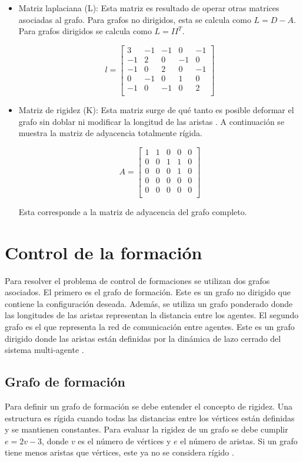 \begin{itemize}
	\item Matriz laplaciana (L): Esta matriz es resultado de operar otras matrices asociadas al grafo. Para grafos no dirigidos, esta se calcula como $L = D - A$. Para grafos dirigidos se calcula como $L = I I^T$.
	
	\[
	l = 
	\left[\begin{array}{ccccc}
		3 & -1 & -1 & 0 & -1 \\
		-1 & 2 & 0 & -1 & 0 \\
		-1 & 0 & 2 & 0 & -1 \\
		0 & -1 & 0 & 1 & 0 \\
		-1 & 0 & -1 & 0 & 2 \\
	\end{array} \right]
	\]
	
	\item Matriz de rigidez (K): Esta matriz surge de qué tanto es posible deformar el grafo sin doblar ni modificar la longitud de las aristas \cite{matrices_asociadas_grafos}. A continuación se muestra la matriz de adyacencia totalmente rígida.
	
	\[
	A = 
	\left[\begin{array}{ccccc}
		1 & 1 & 0 & 0 & 0 \\
		0 & 0 & 1 & 1 & 0 \\
		0 & 0 & 0 & 1 & 0 \\
		0 & 0 & 0 & 0 & 0 \\
		0 & 0 & 0 & 0 & 0 \\
	\end{array} \right]
	\]
	
	Esta corresponde a la matriz de adyacencia del grafo completo.
	
\end{itemize}


\section{Control de la formación}
Para resolver el problema de control de formaciones se utilizan dos grafos asociados. El primero es el grafo de formación. Este es un grafo no dirigido que contiene la configuración deseada. Además, se utiliza un grafo ponderado donde las longitudes de las aristas representan la distancia entre los agentes. El segundo grafo es el que representa la red de comunicación entre agentes. Este es un grafo dirigido donde las aristas están definidas por la dinámica de lazo cerrado del sistema multi-agente \cite{PenaAM_2019_tesis}. 

\subsection{Grafo de formación}
Para definir un grafo de formación se debe entender el concepto de rigidez. Una estructura es rígida cuando todas las distancias entre los vértices están definidas y se mantienen constantes. Para evaluar la rigidez de un grafo se debe cumplir $e = 2v - 3$, donde $v$ es el número de vértices y $e$ el número de aristas. Si un grafo tiene menos aristas que vértices, este ya no se considera rígido \cite{KrickL_2007_tesis}.

